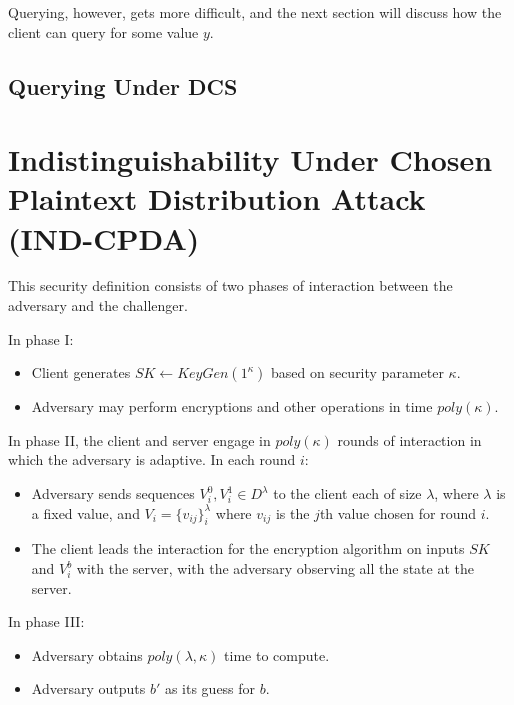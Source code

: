 \documentclass[12pt]{article}
\begin{document}
\begin{figure}
\end{figure}

Querying, however, gets more difficult, and the next section will discuss how the client can query for some value $y$.

\subsection{Querying Under DCS}



\section{Indistinguishability Under Chosen Plaintext Distribution Attack (IND-CPDA)}

This security definition consists of two phases of interaction between the adversary and the challenger.

In phase I:
\begin{itemize}
  \item Client generates $SK \leftarrow KeyGen(1^\kappa)$ based on security parameter $\kappa$.
  \item Adversary may perform encryptions and other operations in time $poly(\kappa)$.
\end{itemize}

In phase II, the client and server engage in $poly(\kappa)$ rounds of interaction in which the adversary is adaptive. In each round $i$:
\begin{itemize}
  \item Adversary sends sequences $V_i^0, V_i^1 \in D^{\lambda}$ to the client each of size $\lambda$, where $\lambda$ is a fixed value, and $V_i = \{ v_{ij} \}_i^{\lambda}$ where $v_{ij}$ is the $j$th value chosen for round $i$.
  \item The client leads the interaction for the encryption algorithm on inputs $SK$ and $V_i^b$ with the server, with the adversary observing all the state at the server.
\end{itemize}

In phase III:
\begin{itemize}
  \item Adversary obtains $poly(\lambda, \kappa)$ time to compute.
  \item Adversary outputs $b'$ as its guess for $b$. 
\end{itemize}
\end{document}
